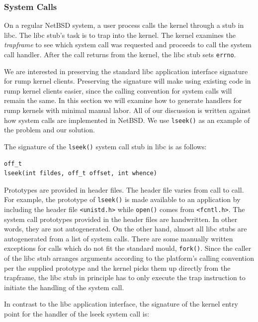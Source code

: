 \subsubsection{System Calls}
\label{sect:syscallentry}

On a regular NetBSD system, a user process calls the kernel through
a stub in libc.  The libc stub's task is to trap into the kernel.
The kernel examines the \textit{trapframe} to see which system call
was requested and proceeds to call the system call handler.  After
the call returns from the kernel, the libc stub sets \texttt{errno}.

We are interested in preserving the standard libc application interface
signature for rump kernel clients.  Preserving the signature will make
using existing code in rump kernel clients easier, since the calling
convention for system calls will remain the same.  In this section we
will examine how to generate handlers for rump kernels with minimal
manual labor.  All of our discussion is written against how system calls
are implemented in NetBSD.  We use \texttt{lseek()} as an example
of the problem and our solution.

The signature of the \verb+lseek()+ system call stub in libc is as
follows:

{\small
\begin{verbatim}
off_t
lseek(int fildes, off_t offset, int whence)
\end{verbatim}}

Prototypes are provided in header files.  The header file
varies from call to call.  For example, the prototype of
\texttt{lseek()} is made available to an application by including
the header file \texttt{<unistd.h>} while \texttt{open()} comes from
\texttt{<fcntl.h>}.  The system call prototypes provided in the
header files are handwritten.  In other words, they are not autogenerated.
On the other hand, almost all libc stubs are autogenerated
from a list of system calls.  There are some manually written
exceptions for calls which do not fit the standard mould, \eg \texttt{fork()}.
Since the caller of the libc stub arranges arguments according to
the platform's calling convention per the supplied prototype and the kernel
picks them up directly from the trapframe, the libc stub in principle
has to only execute the trap instruction to initiate the handling of
the system call.

In contrast to the libc application interface, the signature of
the kernel entry point for the handler of the lseek system call
is:

